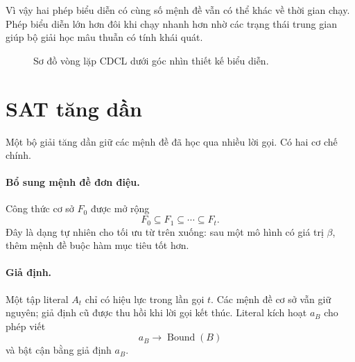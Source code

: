 Vì vậy hai phép biểu diễn có cùng số mệnh đề vẫn có thể khác về thời gian chạy.
Phép biểu diễn lớn hơn đôi khi chạy nhanh hơn nhờ các trạng thái trung gian giúp
bộ giải học mâu thuẫn có tính khái quát.

\begin{figure}[tb]
\centering
{}
\caption{Sơ đồ vòng lặp CDCL dưới góc nhìn thiết kế biểu diễn.}
\label{fig:cdcl-loop}
\end{figure}

\section{SAT tăng dần}

Một bộ giải tăng dần giữ các mệnh đề đã học qua nhiều lời gọi. Có hai cơ chế
chính.

\paragraph{Bổ sung mệnh đề đơn điệu.}
Công thức cơ sở \(F_0\) được mở rộng
\[
  F_0\subseteq F_1\subseteq\cdots\subseteq F_t.
\]
Đây là dạng tự nhiên cho tối ưu từ trên xuống: sau một mô hình có giá trị
\(\beta\), thêm mệnh đề buộc hàm mục tiêu tốt hơn.

\paragraph{Giả định.}
Một tập literal \(A_t\) chỉ có hiệu lực trong lần gọi \(t\). Các mệnh đề cơ sở
vẫn giữ nguyên; giả định cũ được thu hồi khi lời gọi kết thúc. Literal kích
hoạt \(a_B\) cho phép viết
\[
  a_B\rightarrow \operatorname{Bound}(B)
\]
và bật cận bằng giả định \(a_B\).


